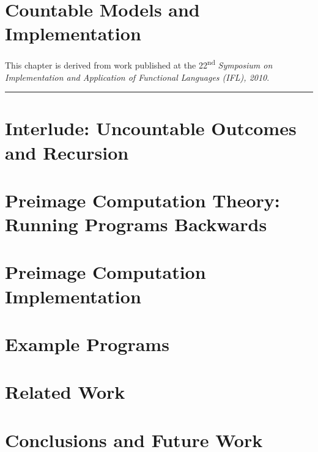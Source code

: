\documentclass[phd,letterpaper,lof,chaptercenter,parttop,electronic]{byumsphd}
\begin{document}



\chapter{Countable Models and Implementation}
\label{ch:countable-models}

This chapter is derived from work published at the 22\textsuperscript{nd} \emph{Symposium on Implementation and Application of Functional Languages (IFL), 2010}.

\vspace{\baselineskip}
\hrule
\vspace{\baselineskip}



\chapter{Interlude: Uncountable Outcomes and Recursion}
\label{ch:interlude}




\chapter{Preimage Computation Theory: Running Programs Backwards}
\label{ch:preimage1}




\chapter{Preimage Computation Implementation}
\label{ch:preimage2}




\chapter{Example Programs}
\label{ch:examples}




\chapter{Related Work}




\chapter{Conclusions and Future Work}
\end{document}
